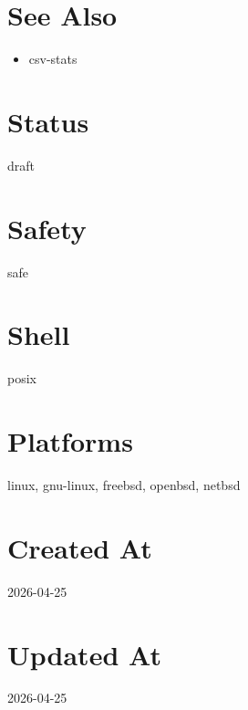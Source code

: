 \documentclass{article}
\begin{document}
\section*{See Also}
\begin{itemize}
  \item csv-stats
\end{itemize}

\section*{Status}
draft

\section*{Safety}
safe

\section*{Shell}
posix

\section*{Platforms}
linux, gnu-linux, freebsd, openbsd, netbsd

\section*{Created At}
2026-04-25

\section*{Updated At}
2026-04-25
\end{document}

